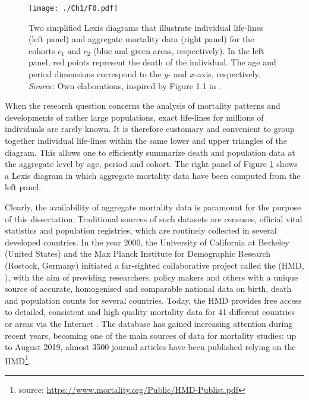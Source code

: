 \documentclass[Thesis]{subfiles}
\begin{document}
\begin{figure}[!ht]
	\begin{center}
		\texttt{[image: ./Ch1/F0.pdf]}
		\caption{Two simplified Lexis diagrams that illustrate individual life-lines (left panel) and aggregate mortality data (right panel) for the cohorts $c_1$ and $c_2$ (blue and green areas, respectively). In the left panel, red points represent the death of the individual. The age and period dimensions correspond to the $y$- and $x$-axis, respectively.\\
		\textit{Source}: Own elaborations, inspired by Figure 1.1 in \cite{camarda2008smoothing}.}\label{Fig:Ch1Lexis}
	\end{center}
\end{figure} 

When the research question concerns the analysis of mortality patterns and developments of rather large populations, exact life-lines for millions of individuals are rarely known. It is therefore customary and convenient to group together individual life-lines within the same lower and upper triangles of the diagram. This allows one to efficiently summarize death and population data at the aggregate level by age, period and cohort. The right panel of Figure \ref{Fig:Ch1Lexis} shows a Lexis diagram in which aggregate mortality data have been computed from the left panel. 

Clearly, the availability of aggregate mortality data is paramount for the purpose of this dissertation. Traditional sources of such datasets are censuses, official vital statistics and population registries, which are routinely collected in several developed countries. In the year 2000, the University of California at Berkeley (United States) and the Max Planck Institute for Demographic Research (Rostock, Germany) initiated a far-sighted collaborative project called the \citeauthor{HMD} (HMD, \citeyear{HMD}), with the aim of providing researchers, policy makers and others with a unique source of accurate, homogenised and comparable national data on birth, death and population counts for several countries. Today, the HMD provides free access to detailed, consistent and high quality mortality data for 41 different countries or areas via the Internet \citep{barbieri2015data,wilmoth2019protocol}. The database has gained increasing attention during recent years, becoming one of the main sources of data for mortality studies: up to August 2019, almost 3500 journal articles have been published relying on the HMD\footnote{source: \url{https://www.mortality.org/Public/HMD-Publist.pdf}}.
\end{document}
